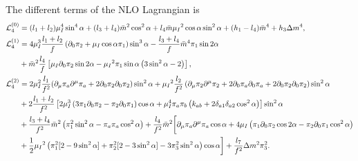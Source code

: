 The different terms of the NLO Lagrangian is
\begin{align}
    \Ell_4^{(0)} & =
    (l_1 + l_2)\mu_I^4 \sin^4{\alpha}
    + (l_3 + l_4)\bar m^2 \cos^2{\alpha}
    + l_4 \bar m \mu_I{}^2 \cos{\alpha} \sin^2{\alpha}
    + (h_1 - l_4)\bar m^4
    + h_3 \Delta m^4,
    \label{NLO-L0}
    \\
    \nonumber
    \Ell_4^{(1)} & =
    4 \mu_I^3 \frac{l_1 + l_2}{f}
    \left(
        \partial_0 \pi_2 
        + \mu_I 
        \cos{\alpha} \pi_1
    \right)\sin^3{\alpha}
    -
    \frac{l_3 + l_4}{f}
    \bar m^4
    \pi_1 \sin{2\alpha}
    \\ \label{NLO-L1}
    & 
    +
    \bar m^2
    \frac{l_4}{f}
    \left[
        \mu_I 
        \partial_0 \pi_2 \sin{2\alpha}
        - \mu_I{}^2
        \pi_1 \sin{\alpha}
        \left(3\sin^2{\alpha} - 2\right)
    \right],
    \\
    \nonumber
    \Ell_4^{(2)} & = 
    2 \mu_I^2 \frac{l_1}{f^2}
    ( 
        \partial_\mu \pi_a \partial^\mu \pi_a
        + 2 \partial_0 \pi_2 \partial_0 \pi_2    
    )
        \sin^2{\alpha}
    + \mu_I{}^2 
    \frac{ l_2}{f^2}
    \left(
        \partial_\mu \pi_2 \partial^\mu \pi_2
        + 2\partial_0 \pi_a\partial_0 \pi_a 
        + 2\partial_0 \pi_2 \partial_0 \pi_2
    \right) 
    \sin^2{\alpha}
    \\ \nonumber
    & + 
    2 \frac{l_1 + l_2}{f^2}
    \left[
        2\mu_I^3 
        \left( 3 \pi_1 \partial_0 \pi_2 - \pi_2 \partial_0 \pi_1 \right)
        \cos{\alpha}
        + \mu_I^4  \pi_a \pi_b 
            \left(k_{ab} + 2\delta_{a1}\delta_{a2}\cos^2{\alpha} \right)
    \right]\sin^2{\alpha}
    \\ \nonumber
    & +
    \frac{l_3 + l_4}{f^2}
    \bar m^2
    \left(\pi_1^2 \sin^2{\alpha} - \pi_a \pi_a \cos^2{\alpha}\right)
    +  \frac{l_4}{f^2}
    \bar m^2
    \bigg[
    \partial_\mu \pi_a \partial^\mu \pi_a \cos{\alpha}
    + 4 \mu_I 
    \left(
        \pi_1 \partial_0 \pi_2 \cos{2\alpha}
        - \pi_2 \partial_0 \pi_1\cos^2{\alpha}
    \right)
    \\
    & %
    +\frac{1}{2} \mu_I{}^2
    \left(                
        \pi_1^2[2 - 9 \sin^2{\alpha}]
        + \pi_2^2 [2 - 3 \sin^2{\alpha}]
        - 3\pi_3^2\sin^2{\alpha}
    \right)
    \cos{\alpha}
    \bigg]
    + \frac{l_7}{f^2}
    \Delta m^2 \pi_3^2.
    \label{NLO-L2}
\end{align}
%

